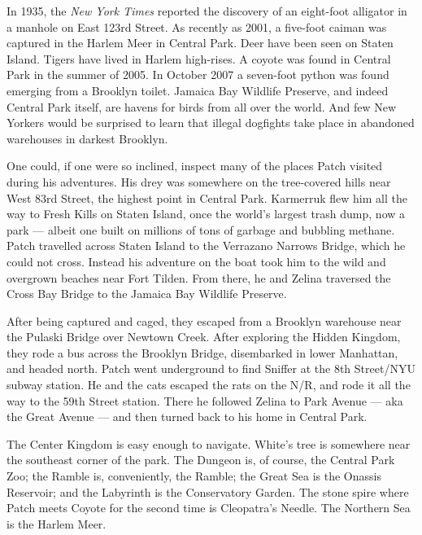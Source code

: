 \documentclass[ebook,oneside,openany,17pt]{memoir}
\newenvironment{tolerant}[1]{%
  \par\tolerance=#1\relax
}{%
  \par
}
\begin{document}
In 1935, the \emph{New York Times} reported the discovery of an
eight-foot alligator in a manhole on East 123rd Street. As recently as
2001, a five-foot caiman was captured in the Harlem Meer in Central
Park. Deer have been seen on Staten Island. Tigers have lived in
Harlem high-rises. A coyote was found in Central Park in the summer of
2005. In October 2007 a seven-foot python was found emerging from a
Brooklyn toilet. Jamaica Bay Wildlife Preserve, and indeed Central
Park itself, are havens for birds from all over the world. And few New
Yorkers would be surprised to learn that illegal dogfights take place
in abandoned warehouses in darkest Brooklyn.

One could, if one were so inclined, inspect many of the places Patch
visited during his adventures. His drey was somewhere on the
tree-covered hills near West 83rd Street, the highest point in Central
Park. Karmerruk flew him all the way to Fresh Kills on Staten Island,
once the world’s largest trash dump, now a park — albeit one built on
millions of tons of garbage and bubbling methane. Patch travelled
across Staten Island to the Verrazano Narrows Bridge, which he could
not cross. Instead his adventure on the boat took him to the wild and
overgrown beaches near Fort Tilden. From there, he and Zelina
traversed the Cross Bay Bridge to the Jamaica Bay Wildlife Preserve.

\begin{tolerant}{1000}
After being captured and caged, they escaped from a Brooklyn warehouse
near the Pulaski Bridge over Newtown Creek. After exploring the Hidden
Kingdom, they rode a bus across the Brooklyn Bridge, disembarked in
lower Manhattan, and headed north. Patch went underground to find
Sniffer at the 8th Street/NYU subway station. He and the cats escaped
the rats on the N/R, and rode it all the way to the 59th Street
station. There he followed Zelina to Park Avenue — aka the Great
Avenue — and then turned back to his home in Central Park.
\end{tolerant}

The Center Kingdom is easy enough to navigate. White’s tree is
somewhere near the southeast corner of the park. The Dungeon is, of
course, the Central Park Zoo; the Ramble is, conveniently, the Ramble;
the Great Sea is the Onassis Reservoir; and the Labyrinth is the
Conservatory Garden. The stone spire where Patch meets Coyote for the
second time is Cleopatra’s Needle. The Northern Sea is the Harlem
Meer.
\end{document}
